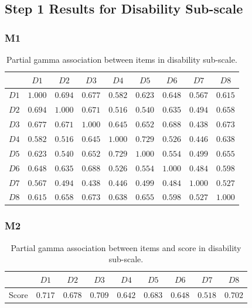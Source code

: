 \subsection{Step 1 Results for Disability Sub-scale}
\subsubsection{M1}
\begin{table}[H]
    \centering
    \begin{tabular}{c | c c c c c c c c}
            & $D1$ & $D2$ & $D3$ & $D4$ & $D5$ & $D6$ & $D7$ & $D8$\\
            \hline 
        $D1$ & $1.000$ & $0.694$ & $0.677$ & $0.582$ & $0.623$ & $0.648$ & $0.567$ & $0.615$ \\
        $D2$ & $0.694$ & $1.000$ & $0.671$ & $0.516$ & $0.540$ & $0.635$ & $0.494$ & $0.658$\\
        $D3$ & $0.677$ & $0.671$ & $1.000$ & $0.645$ & $0.652$ & $0.688$ & $0.438$ & $0.673$ \\
        $D4$ & $0.582$ & $0.516$ & $0.645$ & $1.000$ & $0.729$ & $0.526$ & $0.446$ & $0.638$\\
        $D5$ & $0.623$ & $0.540$ & $0.652$ & $0.729$ & $1.000$ & $0.554$ & $0.499$ & $0.655$ \\
        $D6$ & $0.648$ & $0.635$ & $0.688$ & $0.526$ & $0.554$ & $1.000$ & $0.484$ & $0.598$\\
        $D7$ & $0.567$ & $0.494$ & $0.438$ & $0.446$ & $0.499$ & $0.484$ & $1.000$ & $0.527$\\
        $D8$ & $0.615$ & $0.658$ & $0.673$ & $0.638$ & $0.655$ & $0.598$ & $0.527$ & $1.000$\\
         \hline    
    \end{tabular}
    \caption{Partial gamma association between items in disability sub-scale.}
    \label{tab:M1_dis}
\end{table}

\subsubsection{M2}
\begin{table}[H]
    \centering
    \begin{tabular}{c|c c c c c c c c}
    & $D1$ & $D2$ & $D3$ & $D4$ & $D5$ & $D6$ & $D7$ & $D8$\\
            \hline 
    Score & $0.717$ & $0.678$ &$ 0.709$ & $0.642$ &$ 0.68$3&  $0.648$& $0.518$&  $0.702 $ \\
    \hline 
    \end{tabular}
    \caption{Partial gamma association between items and score in disability sub-scale.}
    \label{tab:M2_dis}
\end{table}

